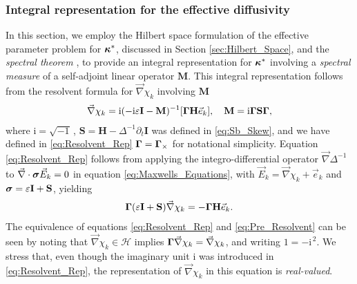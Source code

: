 \documentclass[11pt]{amsart}
\newcommand{\I}{\mathrm{i}}
\newcommand{\Mb}{\mathbf{M}}
\newcommand{\Hb}{\mathbf{H}}
\newcommand{\Ib}{\mathbf{I}}
\newcommand{\Sb}{\mathbf{S}}
\newcommand{\Hs}{\mathscr{H}}
\newcommand\bsig{\mbox{\boldmath${\sigma}$}}
\newcommand\bkappa{\mbox{\boldmath${\kappa}$}}
\newcommand\bGamma{\mbox{\boldmath${\Gamma}$}}
\begin{document}
\subsubsection{Integral representation for the effective
  diffusivity}\label{sec:Integral_Rep}
%
In this section, we employ the Hilbert space formulation of the effective
parameter problem for $\bkappa^*$, discussed in Section
\ref{sec:Hilbert_Space}, and the \emph{spectral theorem}
\cite{Reed-1980,Stone:64,Stakgold:BVP:2000}, to provide an 
integral representation for $\bkappa^*$ involving a \emph{spectral
  measure} of a self-adjoint linear operator $\Mb$. This integral
representation follows from the resolvent formula for $\vec{\nabla}\chi_k$
involving $\Mb$        
% 
\begin{align}\label{eq:Resolvent_Rep}
  \vec{\nabla}\chi_k=\I(-\I\varepsilon\Ib-\Mb)^{-1}[\bGamma\Hb\vec{e}_k], \quad
  \Mb=\I\bGamma\Sb\bGamma,
\end{align}
%
where $\I=\sqrt{-1}\,$, $\Sb=\Hb-\Delta^{-1}\partial_t\Ib$ was defined in
\eqref{eq:Sb_Skew}, and we have defined in \eqref{eq:Resolvent_Rep}
$\bGamma=\bGamma_\times$ for notational simplicity. Equation
\eqref{eq:Resolvent_Rep} follows from 
applying the integro-differential operator $\vec{\nabla}\Delta^{-1}$ to
$\vec{\nabla}\cdot\bsig\vec{E}_k=0$ in equation \eqref{eq:Maxwells_Equations},
with $\vec{E}_k=\vec{\nabla}\chi_k+\vec{e}_k$ and  
$\bsig=\varepsilon\Ib+\Sb$, yielding 
%
\begin{align}\label{eq:Pre_Resolvent}
  \bGamma(\varepsilon\Ib+\Sb)\vec{\nabla}\chi_k=-\bGamma\Hb\vec{e}_k.
\end{align}
%
The equivalence of equations \eqref{eq:Resolvent_Rep} and
\eqref{eq:Pre_Resolvent} can be seen by noting that $\vec{\nabla}\chi_k\in\Hs$
implies $\bGamma\vec{\nabla}\chi_k=\vec{\nabla}\chi_k$, and writing $1=-\I^{\,2}$. We 
stress that, even though the imaginary unit $\I$ was introduced in
\eqref{eq:Resolvent_Rep}, the representation of $\vec{\nabla}\chi_k$ in this
equation is \emph{real-valued}. 
\end{document}
